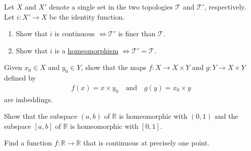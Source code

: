   \begin{exercise}[Munkres 18.3]
    Let $X$ and $X'$ denote a single set in the two topologies $\mathcal{T}$ and $\mathcal{T}'$, respectively. Let $i : X' \to X$ be the identity function.
    \begin{enumerate}
      \item Show that $i$ is continuous $\Leftrightarrow \mathcal{T}'$ is finer than $\mathcal{T}$.
      \item Show that $i$ is a \hyperref[def:homeomorphism]{homeomorphism} $\Leftrightarrow \mathcal{T}' = \mathcal{T}$.
    \end{enumerate}
  \end{exercise}

  \begin{exercise}[Munkres 18.4]
    Given $x_0 \in X$ and $y_0 \in Y$, show that the maps $f : X \to X \times Y$ and $g : Y \to X \times Y$ defined by
    \begin{align*}
      f(x) = x \times y_0 \quad \text{and} \quad g(y) = x_0 \times y
    \end{align*}
    are imbeddings.
  \end{exercise}

  \begin{exercise}[Munkres 18.5]
    Show that the subspace $(a, b)$ of $\mathbb{R}$ is homeomorphic with $(0, 1)$ and the subspace $[a, b]$ of $\mathbb{R}$ is homeomorphic with $[0, 1]$.
  \end{exercise}

  \begin{exercise}[Munkres 18.6]
    Find a function $f : \mathbb{R} \to \mathbb{R}$ that is continuous at precisely one point.
  \end{exercise}

